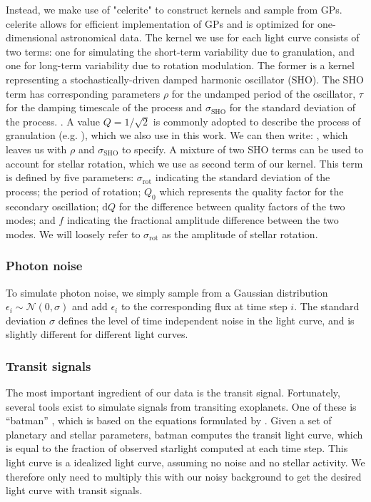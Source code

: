 Instead, we make use of "celerite" \cite{foreman2017fast} to construct kernels and sample from GPs. celerite allows for efficient implementation of GPs and is optimized for one-dimensional astronomical data. The kernel we use for each light curve consists of two terms: one for simulating the short-term variability due to granulation, and one for long-term variability due to rotation modulation. The former is a kernel representing a stochastically-driven damped harmonic oscillator (SHO). The SHO term has corresponding parameters $\rho$ for the undamped period of the oscillator, $\tau$ for the damping timescale of the process and $\sigma_\text{SHO}$ for the standard deviation of the process. . A value $Q=1/\sqrt{2}$ is commonly adopted to describe the process of granulation (e.g. \cite{barros2020improving}), which we also use in this work. We can then write: , which leaves us with $\rho$ and $\sigma_\text{SHO}$ to specify. A mixture of two SHO terms can be used to account for stellar rotation, which we use as second term of our kernel. This term is defined by five parameters:  $\sigma_\text{rot}$ indicating the standard deviation of the process; the period of rotation; $Q_0$ which represents the quality factor for the secondary oscillation; $\text{d}Q$ for the difference between quality factors of the two modes; and $f$ indicating the fractional amplitude difference between the two modes. We will loosely refer to $\sigma_\text{rot}$ as the amplitude of stellar rotation.

\subsubsection{Photon noise}
To simulate photon noise, we simply sample from a Gaussian distribution $\epsilon_i \sim \mathcal{N}(0, \sigma)$ and add $\epsilon_i$ to the corresponding flux at time step $i$. The standard deviation $\sigma$ defines the level of time independent noise in the light curve, and is slightly different for different light curves.

\subsubsection{Transit signals}
The most important ingredient of our data is the transit signal. Fortunately, several tools exist to simulate signals from transiting exoplanets. One of these is “batman” \citep{kreidberg2015batman}, which is based on the equations formulated by \cite{mandel2002analytic}. Given a set of planetary and stellar parameters, batman computes the transit light curve, which is equal to the fraction of observed starlight computed at each time step. This light curve is a idealized light curve, assuming no noise and no stellar activity. We therefore only need to multiply this with our noisy background to get the desired light curve with transit signals. 

